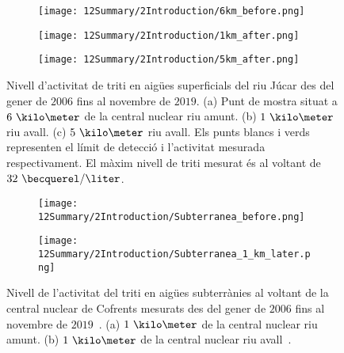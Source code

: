 \begin{figure}
\centering
    \begin{subfigure}[b]{0.7\textwidth}
    \centering
    \texttt{[image: 12Summary/2Introduction/6km\_before.png]}  
    \caption{\label{subfig:TritiL6kB}}
    \end{subfigure}
    \hfill
    \begin{subfigure}[b]{0.7\textwidth}
    \centering
    \texttt{[image: 12Summary/2Introduction/1km\_after.png]}  
    \caption{\label{subfig:TritiL1kA}}
    \end{subfigure}
    \hfill
    \begin{subfigure}[b]{0.7\textwidth}
    \centering
    \texttt{[image: 12Summary/2Introduction/5km\_after.png]}  
    \caption{\label{subfig:TritiL5kA}}
    \end{subfigure}
 \caption{Nivell d'activitat de triti en aigües superficials del riu Júcar des del gener de $2006$ fins al novembre de $2019$. (a) Punt de mostra situat a $6~\kilo\meter$ de la central nuclear riu amunt. (b) $1~\kilo\meter$ riu avall. (c) $5~\kilo\meter$ riu avall. Els punts blancs i verds representen el límit de detecció i l'activitat mesurada respectivament. El màxim nivell de triti mesurat és al voltant de $32~\becquerel/\liter$.~\cite{REM}}
 \label{fig:MesuresSuperficialsCofrents}
\end{figure}

\begin{figure}
\centering
    \begin{subfigure}[b]{0.7\textwidth}
    \centering
    \texttt{[image: 12Summary/2Introduction/Subterranea\_before.png]}  
    \caption{\label{subfig:TritiLG1kB}}
    \end{subfigure}
    \hfill
    \begin{subfigure}[b]{0.7\textwidth}
    \centering
    \texttt{[image: 12Summary/2Introduction/Subterranea\_1\_km\_later.png]}  
    \caption{\label{subfig:TritiLG1kA}}
    \end{subfigure}
 \caption{Nivell de l'activitat del triti en aigües subterrànies al voltant de la central nuclear de Cofrents mesurats des del gener de $2006$ fins al novembre de $2019$~\cite{REM}. (a) $1~\kilo\meter$ de la central nuclear riu amunt. (b) $1~\kilo\meter$ de la central nuclear riu avall~\cite{REM}.}
 \label{fig:MesuresSuperterraniesCofrents}
\end{figure}

